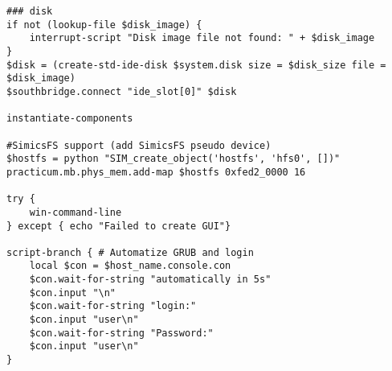 \begin{lstlisting}
### disk
if not (lookup-file $disk_image) {
    interrupt-script "Disk image file not found: " + $disk_image
}
$disk = (create-std-ide-disk $system.disk size = $disk_size file = $disk_image)
$southbridge.connect "ide_slot[0]" $disk

instantiate-components

#SimicsFS support (add SimicsFS pseudo device)
$hostfs = python "SIM_create_object('hostfs', 'hfs0', [])"
practicum.mb.phys_mem.add-map $hostfs 0xfed2_0000 16

try {
    win-command-line
} except { echo "Failed to create GUI"}

script-branch { # Automatize GRUB and login
    local $con = $host_name.console.con
    $con.wait-for-string "automatically in 5s"
    $con.input "\n"
    $con.wait-for-string "login:"
    $con.input "user\n"
    $con.wait-for-string "Password:"
    $con.input "user\n"
}

\end{lstlisting}
